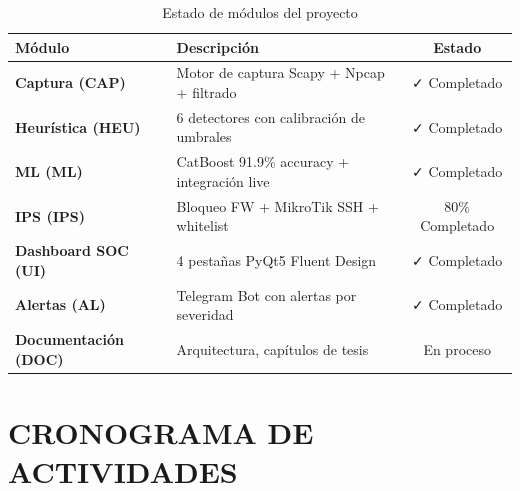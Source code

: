 \documentclass[12pt, letterpaper, oneside]{report}
\newcommand{\tabhead}[1]{\textbf{\color{white}#1}}
\begin{document}
\begin{table}[H]
  \centering
  \caption{Estado de módulos del proyecto}
  \label{tab:estado}
  \begin{tabularx}{\textwidth}{>{\bfseries}p{3cm} X c}
    \toprule
    \rowcolor{unipazblue}
    \tabhead{Módulo} & \tabhead{Descripción} & \tabhead{Estado} \\
    \midrule
    Captura (CAP) & Motor de captura Scapy + Npcap + filtrado & ✓ Completado \\
    Heurística (HEU) & 6 detectores con calibración de umbrales & ✓ Completado \\
    ML (ML) & CatBoost 91.9\% accuracy + integración live & ✓ Completado \\
    IPS (IPS) & Bloqueo FW + MikroTik SSH + whitelist & 80\% Completado \\
    Dashboard SOC (UI) & 4 pestañas PyQt5 Fluent Design & ✓ Completado \\
    Alertas (AL) & Telegram Bot con alertas por severidad & ✓ Completado \\
    Documentación (DOC) & Arquitectura, capítulos de tesis & En proceso \\
    \bottomrule
  \end{tabularx}
\end{table}

\chapter{CRONOGRAMA DE ACTIVIDADES}
\end{document}

